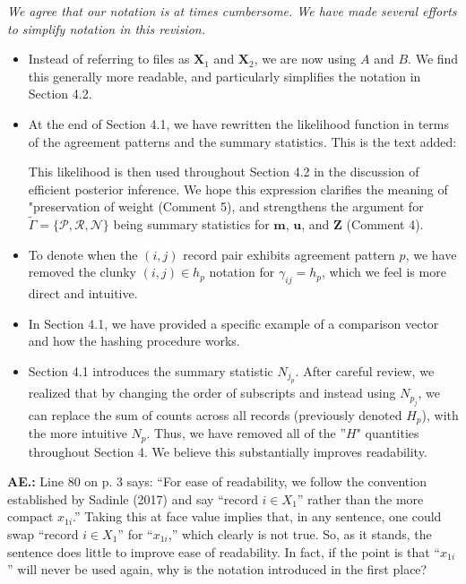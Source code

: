 \documentclass[letterpaper, parskip]{scrartcl}
\newcommand{\pointRaised}[2]{%
	\textbf{#1.\theresponsectr:} #2
}
\newcounter{responsectr}[section]     %
\newcommand{\reply}[1]{%
	\refstepcounter{responsectr}%
		\begin{tcolorbox}
			\itshape #1
		\end{tcolorbox}
}
\begin{document}
\reply{We agree that our notation is at times cumbersome. We have made several efforts to simplify notation in this revision.

\begin{itemize}
	\item Instead of referring to files as $\mathbf{X}_1$ and $\mathbf{X}_2$, we are now using $A$ and $B$. We find this generally more readable, and particularly simplifies the notation in Section 4.2. 
	\item At the end of Section 4.1, we have rewritten the likelihood function in terms of the agreement patterns and the summary statistics. This is the text added:
	
	This likelihood is then used throughout Section 4.2 in the discussion of efficient posterior inference. We hope this expression clarifies the meaning of "preservation of weight (Comment 5), and strengthens the argument for $\tilde{\Gamma} = \{\mathcal{P}, \mathcal{R}, \mathcal{N} \}$ being summary statistics for $\bm{m}$, $\bm{u}$, and $\bm{Z}$ (Comment 4). 
	
	\item To denote when the $(i,j)$ record pair exhibits agreement pattern $p$, we have removed the clunky $(i, j) \in h_p$ notation for $\gamma_{ij} = h_p$, which we feel is more direct and intuitive.
	
	\item In Section 4.1, we have provided a specific example of a comparison vector and how the hashing procedure works. 
	
	\item Section 4.1 introduces the summary statistic $N_{j_p}$. After careful review, we realized that by changing the order of subscripts and instead using $N_{p_j}$, we can replace the sum of counts across all records (previously denoted $H_p$), with the more intuitive $N_p$. Thus, we have removed all of the ''$H$" quantities throughout Section 4. We believe this substantially improves readability. 
\end{itemize}
}

\pointRaised{AE}{Line 80 on p. 3 says: “For ease of readability, we follow the convention established by Sadinle (2017) and say “record $i \in X_1$” rather than the more compact $x_{1i}$.” Taking this at face value implies that, in any sentence, one could swap “record $i \in X_1$” for “$x_{1i}$,” which clearly is not true.  So, as it stands, the sentence does little to improve ease of readability.  In fact, if the point is that “$x_{1i}$” will never be used again, why is the notation introduced in the first place?}
\end{document}
